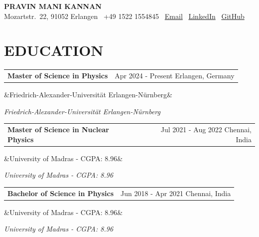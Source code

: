 \documentclass[11pt, a4paper]{article}
\makeatletter
\newcommand{\cventry}[3]{%
  \noindent
  \begin{tabularx}{\linewidth}{@{}X r@{}}
    \textbf{#1} & \small #3
  \end{tabularx}%
  \ifx&#2&\else\vspace{-\parskip}\vspace{0pt}\par\noindent\textit{#2}\fi
  \vspace{1pt}%
}
\newenvironment{cvlist}{%
  \begin{itemize}[leftmargin=1.2em, itemsep=0pt, parsep=0pt, topsep=0pt]
}{%
  \end{itemize}
}
\makeatother
\begin{document}
\pagestyle{empty}   %

\begin{center}
  {\Huge\bfseries PRAVIN MANI KANNAN}\\[3pt]
  \small
  Mozartstr.\ 22, 91052 Erlangen
  \quad\textbar\quad
  \faPhone\ +49 1522 1554845
  \quad\textbar\quad
  \faEnvelope\ \href{pravin.mani@fau.de}{Email}
  \quad\textbar\quad
  \faLinkedin\ \href{http://www.linkedin.com/in/mpravin21/}{LinkedIn}
  \quad\textbar\quad
  \faGithub\ \href{https://github.com/Usernotfoundoops}{GitHub}
\end{center}

\vspace{4pt}
\section{EDUCATION}

\cventry{Master of Science in Physics}
        {Friedrich-Alexander-Universität Erlangen-Nürnberg}
        {Apr 2024 - Present \hfill Erlangen, Germany}

\vspace{0pt}

\cventry{Master of Science in Nuclear Physics}
        {University of Madras - CGPA: 8.96}
        {Jul 2021 - Aug 2022 \hfill Chennai, India}

\vspace{0pt}

\cventry{Bachelor of Science in Physics}
        {University of Madras - CGPA: 8.96}
        {Jun 2018 - Apr 2021 \hfill Chennai, India}

%
\vspace{7pt}
\end{document}
